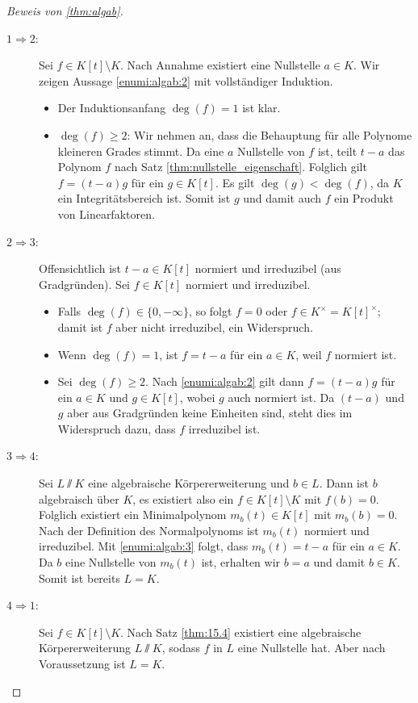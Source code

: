 \documentclass[12pt,a4paper]{scrartcl}
\begin{document}
\begin{proof}[Beweis von \cref{thm:algab}]
	\leavevmode
	\begin{description}
		\item[\glqq$1\Rightarrow2$\grqq:] Sei $f \in K[t]\setminus K$. Nach Annahme existiert eine Nullstelle $a \in K$. Wir zeigen Aussage \ref{enumi:algab:2} mit vollständiger Induktion.
		\begin{itemize}
			\item Der Induktionsanfang $\deg(f) = 1$ ist klar.
			\item $\deg(f)\geq 2$: Wir nehmen an, dass die Behauptung für alle Polynome kleineren Grades stimmt. Da eine $a$ Nullstelle von $f$ ist, teilt $t-a$ das Polynom $f$ nach Satz \ref{thm:nullstelle_eigenschaft}.
			Folglich gilt $f = (t-a)g$ für ein $g\in K[t]$. Es gilt $\deg(g)<\deg(f)$, da $K$ ein Integritätsbereich ist. Somit ist $g$ und damit auch $f$ ein Produkt von Linearfaktoren.
		\end{itemize}
		\item[\glqq$2\Rightarrow 3$\grqq:] Offensichtlich ist $t-a\in K[t]$ normiert und irreduzibel (aus Gradgründen). Sei $f\in K[t]$ normiert und irreduzibel.
		\begin{itemize}
			\item Falls $\deg(f) \in\{0,-\infty\}$, so folgt $f=0$ oder $f\in K^{\times} = K[t]^{\times}$; damit ist $f$ aber nicht irreduzibel, ein Widerspruch.
			\item Wenn $\deg(f) = 1$, ist $f = t-a$ für ein $a\in K$, weil $f$ normiert ist.
			\item Sei $\deg (f)\geq 2$. Nach \ref{enumi:algab:2} gilt dann $f = (t-a)g$ für ein $a\in K$ und $g\in K[t]$, wobei $g$ auch normiert ist. Da $(t-a)$ und $g$ aber aus Gradgründen keine Einheiten sind, steht dies im Widerspruch dazu, dass $f$ irreduzibel ist.
		\end{itemize}
		\item[\glqq$3\Rightarrow 4$\grqq:] Sei $L\sslash K$ eine algebraische Körpererweiterung und $b\in L$. Dann ist $b$ algebraisch über $K$, es existiert also ein $f\in K[t]\setminus K$ mit $f(b) = 0$. Folglich existiert ein Minimalpolynom $m_b(t)\in K[t]$ mit $m_b(b)= 0$. Nach der Definition des Normalpolynoms ist $m_b(t)$ normiert und irreduzibel. Mit \ref{enumi:algab:3} folgt, dass $m_b(t) = t-a$ für ein $a\in K$. Da $b$ eine Nullstelle von $m_b(t)$ ist, erhalten wir $b = a$ und damit $b\in K$. Somit ist bereits $L = K$.
		\item[\glqq$4\Rightarrow1$\grqq:] Sei $f\in K[t]\setminus K$. Nach Satz \ref{thm:15.4} existiert eine algebraische Körpererweiterung $L\sslash K$, sodass $f$ in $L$ eine Nullstelle hat. Aber nach Voraussetzung ist $L = K$. 
  \qedhere
	\end{description}
\end{proof}
	
\end{document}
